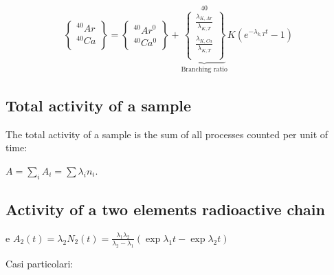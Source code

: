 \documentclass[main.tex]{subfiles}
\begin{document}
\begin{align*}
\left\{ \begin{array}{c} ^{40}Ar\\^{40}Ca\\ \end{array} \right\}= \left\{ \begin{array}{c} ^{40}Ar^0 \\ ^{40}Ca^0 \end{array} \right\} + \underbrace{\left\{\begin{array}{c} \frac{\lambda_{K,Ar}}{\lambda_{K,T}}\\ \frac{\lambda_{K,Ca}}{\lambda_{K,T}}\\ \end{array}\right\}}_{\text{Branching ratio}}^{40}K(e^{-\lambda_{k,T}t}-1)
\end{align*}

\subsection{Total activity of a sample}

The total activity of a sample is the sum of all processes counted per unit of time:

$A=\sum_iA_i=\sum\lambda_in_i$.

\subsection{Activity of a two elements radioactive chain}

 e $A_2(t)=\lambda_2N_2(t)=\frac{\lambda_1\lambda_2}{\lambda_2-\lambda_1}(\exp{\lambda_1t}-\exp{\lambda_2t})$

Casi particolari:
\end{document}

